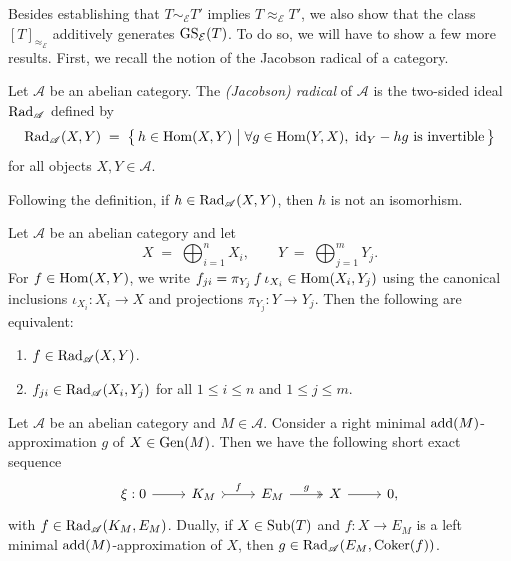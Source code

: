 Besides establishing that \(T \sim_{\mathcal{E}} T'\) implies \(T \approx_{\mathcal{E}} T'\), we also show that the class \([T]_{\approx_{\mathcal{E}}}\) additively generates \(\operatorname{GS}_{\mathcal{E}}(T)\).
To do so, we will have to show a few more results. First, we recall the notion of the Jacobson radical of a category.



\begin{definition}\label{def:jacobson-radical} Let $\mathscr{A}$ be an abelian category.
The \emph{(Jacobson) radical} of $\mathscr{A}$ is the two-sided ideal
$\operatorname{Rad}_{\mathscr{A}}$ defined by
\[
\operatorname{Rad}_{\mathscr{A}}(X,Y)
\;=\;
\bigl\{\, h \in \operatorname{Hom}(X,Y)
\;\big|\;
\forall g \in \operatorname{Hom}(Y,X),\ \text{id}_Y - hg
\text{ is invertible}
\,\bigr\}
\]
for all objects $X,Y \in \mathscr{A}$.
\end{definition}

\begin{remark}
Following the definition, if $h \in \operatorname{Rad}_{\mathscr{A}}(X,Y)$, then $h$ is not an isomorhism.
\end{remark}

\begin{lemma}\label{lem:rad-on-sums}
Let $\mathscr{A}$ be an abelian category and let
\[
X \;=\; \bigoplus_{i=1}^n X_i,
\qquad
Y \;=\; \bigoplus_{j=1}^m Y_j.
\]
For $f \in \operatorname{Hom}(X,Y)$, we write $f_{ji} = \pi_{Y_j}\, f\, \iota_{X_i} \in \operatorname{Hom}(X_i,Y_j)$
using the canonical inclusions $\iota_{X_i}:X_i\to X$ and projections $\pi_{Y_j}:Y\to Y_j$.
Then the following are equivalent:
\begin{enumerate}[label=$(\roman*)$, itemsep=1mm]
  \item $f \in \operatorname{Rad}_{\mathscr{A}}(X,Y)$.
  \item $f_{ji}\in \operatorname{Rad}_{\mathscr{A}}(X_i,Y_j)$ for all $1\le i\le n$ and $1\le j\le m$.
\end{enumerate}
\end{lemma}

\begin{lemma}\label{lem:minimalrad}
Let $\mathscr{A}$ be an abelian category and $M \in \mathscr{A}$. Consider a right minimal $\operatorname{add}(M)$-approximation $g$ of $X \in \operatorname{Gen}(M)$. Then we have the following short exact sequence 
    \[\begin{tikzcd}
	\xi : 0 & K_M & E_M  & X &  0,
	\arrow[from=1-1, to=1-2]
	\arrow["f",tail, from=1-2, to=1-3]
	\arrow["g",two heads,from=1-3, to=1-4]
	\arrow[from=1-4, to=1-5]
    \end{tikzcd} \]
    with $f \in \operatorname{Rad}_{\mathscr{A}}(K_M,E_M)$. Dually, if $ X \in \operatorname{Sub}(T)$ and $f : X \rightarrow E_M$ is a left minimal $\operatorname{add}(M)$-approximation of $X$, then $g \in \operatorname{Rad}_{\mathscr{A}}(E_M,\operatorname{Coker}(f))$. 
\end{lemma}

